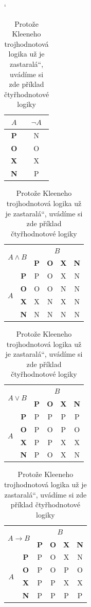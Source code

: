 \documentclass[a4paper, 11pt]{article}
\newcommand{\myuv}[1]{\quotedblbase #1\textquotedblleft}
\begin{document}
\begin{table}[ht]
	\begin{center} \catcode`
	\begin{tabular}{|c|c|} \hline
	$A$ & $\neg A$ \\ \hline
	\textbf{P}& N \\ \hline
	\textbf{O}& O \\ \hline
	\textbf{X}& X \\ \hline
	\textbf{N}& P \\ \hline
	\end{tabular}
	\begin{tabular}{|c|c|c|c|c|c|} \hline
	\multicolumn{2}{|c|}{\multirow{2}{*}{$A\wedge B$}} &\multicolumn{4}{|c|}{$B$}\\ \cline{3-6}
	\multicolumn{2}{|c|}{} & \textbf{P} & \textbf{O} & \textbf{X} & \textbf{N} \\ \hline
	\multirow{4}{*}{$A$}& \textbf{P} & P & O & X & N \\ \cline{2-6}
	& \textbf{O} & O & O & N & N \\ \cline{2-6}
	& \textbf{X} & X & N & X & N \\ \cline{2-6}
	& \textbf{N} & N & N & N & N \\ \hline
	\end{tabular}
	\begin{tabular}{|c|c|c|c|c|c|} \hline
	\multicolumn{2}{|c|}{\multirow{2}{*}{$A\vee B$}} &\multicolumn{4}{|c|}{$B$}\\ \cline{3-6}
	\multicolumn{2}{|c|}{} & \textbf{P} & \textbf{O} & \textbf{X} & \textbf{N} \\ \hline
	\multirow{4}{*}{$A$}& \textbf{P} & P & P & P & P \\ \cline{2-6}
	& \textbf{O} & P & O & P & O \\ \cline{2-6}
	& \textbf{X} & P & P & X & X \\ \cline{2-6}
	& \textbf{N} & P & O & X & N \\ \hline
	\end{tabular}
	\begin{tabular}{|c|c|c|c|c|c|} \hline
	\multicolumn{2}{|c|}{\multirow{2}{*}{$A\rightarrow B$}} &\multicolumn{4}{|c|}{$B$}\\ \cline{3-6}
	\multicolumn{2}{|c|}{} & \textbf{P} & \textbf{O} & \textbf{X} & \textbf{N} \\ \hline
	\multirow{4}{*}{$A$}& \textbf{P} & P & O & X & N \\ \cline{2-6}
	& \textbf{O} & P & O & P & O \\ \cline{2-6}
	& \textbf{X} & P & P & X & X \\ \cline{2-6}
	& \textbf{N} & P & P & P & P \\ \hline
	\end{tabular}
	\caption{Protože Kleeneho trojhodnotová logika už je \myuv{zastaralá}, uvádíme si zde příklad čtyřhodnotové logiky}
	\label{tab2}
	\end{center}
\end{table}
\pagebreak
\newpage
\end{document}
